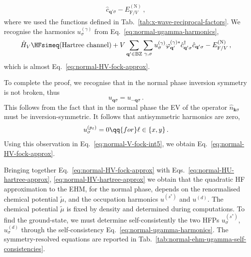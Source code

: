 \begin{tabproof}
\begin{multline}
		\hat c_{\mathbf{q}'\sigma} - E_{\mathrm{F}/V}^{(\mathrm{N})} \, , \label{eq:normal-V-fock-int4}
	\end{multline}
	where we used the functions defined in Tab.~\ref{tab:x-wave-reciprocal-factors}. We recognise the harmonics $u_\sigma^{(\gamma)}$ from Eq.~\eqref{eq:normal-ugamma-harmonics},
	\begin{equation}\label{eq:normal-V-fock-int5}
		\hat H_V \HFsimeq (\text{Hartree channel}) + V \sum_{\mathbf{q}'\in\mathrm{BZ}} \sum_{\gamma,\sigma} u_\sigma^{(\gamma)}
		\varphi_{\mathbf{q}'}^{(\gamma)*}
		\hat c_{\mathbf{q}'\sigma}^\dagger
		\hat c_{\mathbf{q}'\sigma} - E_{\mathrm{F}/V}^{(\mathrm{N})} \, ,
	\end{equation}
	which is almost Eq.~\eqref{eq:normal-HV-fock-approx}. 
	
	To complete the proof, we recognise that in the normal phase inversion symmetry is not broken, thus
	\[
		u_{\mathbf{q}\sigma} = u_{-\mathbf{q}\sigma} \, .
	\]
	This follows from the fact that in the normal phase the EV of the operator $\hat n_{\mathbf{k}\sigma}$ must be inversion-symmetric. It follows that antisymmetric harmonics are zero,
	\begin{equation}\label{eq:normal-up=0}
		u_\sigma^{(p_\ell)} = 0
		\qq{for}
		\ell\in\lbrace x,y \rbrace \, .
	\end{equation}
	Using this observation in Eq.~\eqref{eq:normal-V-fock-int5}, we obtain Eq.~\eqref{eq:normal-HV-fock-approx}.
	
\end{tabproof}

Bringing together Eq.~\eqref{eq:normal-HV-fock-approx} with Eqs.~\eqref{eq:normal-HU-hartree-approx}, \eqref{eq:normal-HV-hartree-approx} we obtain that the quadratic HF approximation to the EHM, for the normal phase, depends on the renormalised chemical potential $\tilde{\mu}$, and the occupation harmonics $u^{(s^*)}$ and $u^{(d)}$. The chemical potential $\tilde{\mu}$ is fixed by density and determined during computations. To find the ground-state, we must determine self-consistently the two HFPs $u_\sigma^{(s^*)}$, $u_\sigma^{(d)}$ through the self-consistency Eq.~\eqref{eq:normal-ugamma-harmonics}. The symmetry-resolved equations are reported in Tab.~\ref{tab:normal-ehm-ugamma-self-consistencies}.

